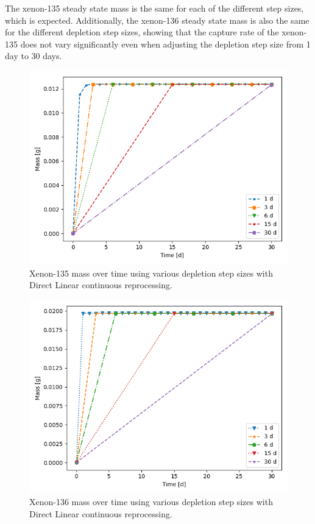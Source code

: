 The xenon-135 steady state mass is the same for each of the different step sizes, which is expected. Additionally, the xenon-136 steady state mass is also the same for the different depletion step sizes, showing that the capture rate of the xenon-135 does not vary significantly even when adjusting the depletion step size from 1 day to 30 days.

\begin{figure}[H]
  \centering
  \includegraphics[scale=0.7]{images/DL_NSTEP_Xe-135_mass.png}
  \caption{Xenon-135 mass over time using various depletion step sizes with Direct Linear continuous reprocessing.}
   \label{fig:DL-cont-xe135}
\end{figure}

\begin{figure}[H]
  \centering
  \includegraphics[scale=0.7]{images/DL_NSTEP_Xe-136_mass.png}
  \caption{Xenon-136 mass over time using various depletion step sizes with Direct Linear continuous reprocessing.}
   \label{fig:DL-cont-xe136}
\end{figure}

